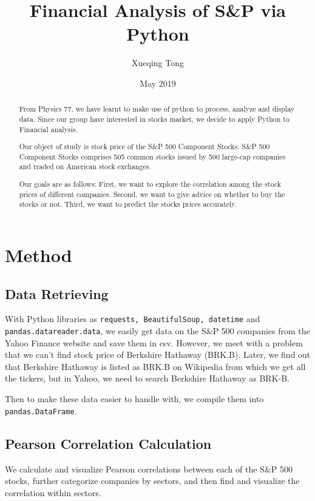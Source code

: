 \documentclass{article}
\title{\bf{Financial Analysis of S\&P via Python}}
\author{Xueqing Tong}
\date{May 2019}
\begin{document}
    \begin{titlepage}
        \maketitle
        \setcounter{page}{0}
        \thispagestyle{empty}
    \end{titlepage}

    \renewcommand{\abstractname}{Introduction}
    \begin{abstract}
        From Physics 77, we have learnt to make use of python to process, analyze and display data. Since our group have interested in stocks market, we decide to apply Python to Financial analysis.

        Our object of study is stock price of the S\&P 500 Component Stocks. S\&P 500 Component Stocks comprises 505 common stocks issued by 500 large-cap companies and traded on American stock exchanges. 

        Our goals are as follows: First, we want to explore the correlation among the stock prices of different companies. Second, we want to give advice on whether to buy the stocks or not. Third, we want to predict the stocks prices accurately.
    \end{abstract}



    \section{Method}
    
        \subsection{Data Retrieving}
        With Python libraries as \verb!requests, BeautifulSoup, datetime! and \verb!pandas.datareader.data!, we easily get data on the S\&P 500 companies from the Yahoo Finance website and save them in csv. However, we meet with a problem that we can't find stock price of Berkshire Hathaway (BRK.B). Later, we find out that Berkshire Hathaway is listed as BRK.B on Wikipedia from which we get all the tickers, but in Yahoo, we need to search Berkshire Hathaway as BRK-B.

        Then to make these data easier to handle with, we compile them into \verb!pandas.DataFrame!.

        \subsection{Pearson Correlation Calculation}
        We calculate and visualize Pearson correlations between each of the S\&P 500 stocks, further categorize companies by sectors, and then find and visualize the correlation within sectors. 
        
\end{document}
